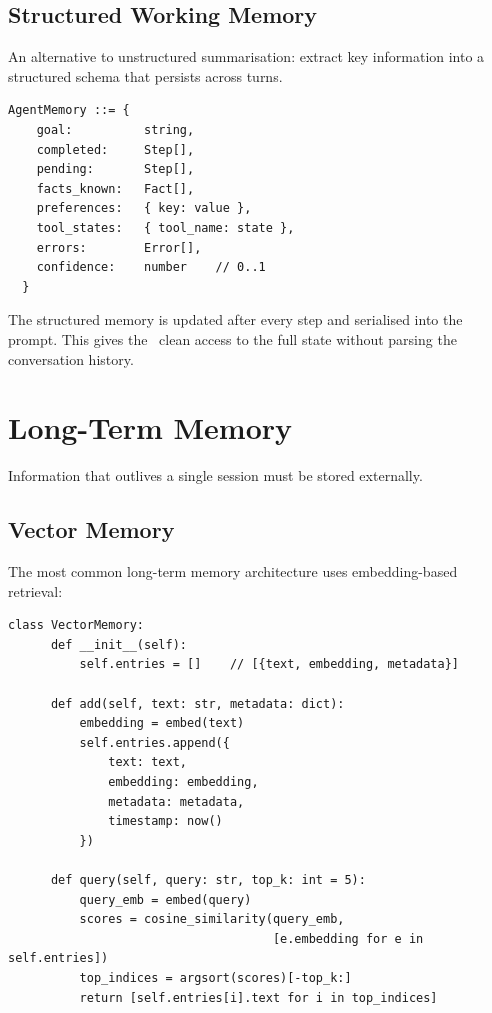 \subsection{Structured Working Memory}

An alternative to unstructured summarisation: extract key information into a structured schema that persists across turns.

\begin{lstlisting}[caption=Structured memory schema]
  AgentMemory ::= {
    goal:          string,
    completed:     Step[],
    pending:       Step[],
    facts_known:   Fact[],
    preferences:   { key: value },
    tool_states:   { tool_name: state },
    errors:        Error[],
    confidence:    number    // 0..1
  }
\end{lstlisting}

The structured memory is updated after every step and serialised into the prompt. This gives the \llm\ clean access to the full state without parsing the conversation history.

\section{Long-Term Memory}

Information that outlives a single session must be stored externally.

\subsection{Vector Memory}

The most common long-term memory architecture uses embedding-based retrieval:

\begin{lstlisting}[caption=Vector memory store]
  class VectorMemory:
      def __init__(self):
          self.entries = []    // [{text, embedding, metadata}]

      def add(self, text: str, metadata: dict):
          embedding = embed(text)
          self.entries.append({
              text: text,
              embedding: embedding,
              metadata: metadata,
              timestamp: now()
          })

      def query(self, query: str, top_k: int = 5):
          query_emb = embed(query)
          scores = cosine_similarity(query_emb,
                                     [e.embedding for e in self.entries])
          top_indices = argsort(scores)[-top_k:]
          return [self.entries[i].text for i in top_indices]
\end{lstlisting}

